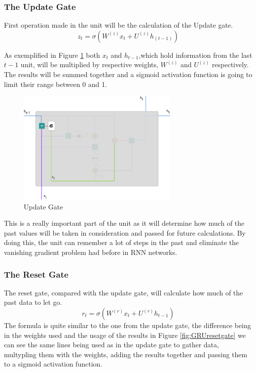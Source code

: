 \subsubsection{The Update Gate}

First operation made in the unit will be the calculation of the Update gate.
\begin{equation}
  z_t =\sigma(W^{(z)}x_t + U^{(z)}h_{(t-1)})
\end{equation}

As exemplified in Figure \ref{fig:GRUupdategate} both $x_t$ and $h_{t-1}$,which hold information from the last $t-1$ unit, will be multiplied by respective weights, $W^{(z)}$ and $U^{(z)}$ respectively. The results will be summed together and a sigmoid activation function is going to limit their range between 0 and 1.

\begin{figure}[htp]
	\centering
	\includegraphics[width=0.7\textwidth]{Illustrations/GRUupdategate.png}
	\caption{Update Gate}
	\label{fig:GRUupdategate}
\end{figure}

This is a really important part of the unit as it will determine how much of the past values will be taken in consideration and passed for future calculations. By doing this, the unit can remember a lot of steps in the past and eliminate the vanishing gradient problem had before in RNN networks.
\subsubsection{The Reset Gate}
The reset gate, compared with the update gate, will calculate how much of the past data to let go.
\begin{equation}
r_t=\sigma(W^{(r)}x_t+U^{(r)}h_{t-1})
\end{equation}
The formula is quite similar to the one from the update gate, the difference being in the weights used and the usage of the results in Figure \ref{fig:GRUresetgate} we can see the same lines being used as in the update gate to gather data, multypling them with the weights, adding the results together and passing them to a sigmoid activation function.


